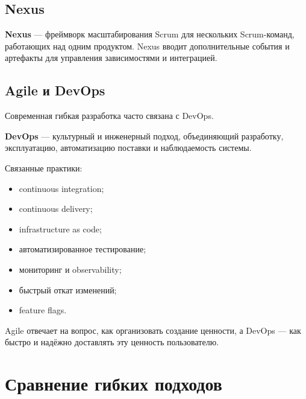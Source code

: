 \documentclass[12pt,a4paper]{article}
\begin{document}
\subsection{Nexus}

\textbf{Nexus} --- фреймворк масштабирования Scrum для нескольких Scrum-команд, работающих над одним продуктом. Nexus вводит дополнительные события и артефакты для управления зависимостями и интеграцией.

\subsection{Agile и DevOps}

Современная гибкая разработка часто связана с DevOps.

\textbf{DevOps} --- культурный и инженерный подход, объединяющий разработку, эксплуатацию, автоматизацию поставки и наблюдаемость системы.

Связанные практики:
\begin{itemize}
    \item continuous integration;
    \item continuous delivery;
    \item infrastructure as code;
    \item автоматизированное тестирование;
    \item мониторинг и observability;
    \item быстрый откат изменений;
    \item feature flags.
\end{itemize}

Agile отвечает на вопрос, как организовать создание ценности, а DevOps --- как быстро и надёжно доставлять эту ценность пользователю.

\section{Сравнение гибких подходов}
\end{document}
